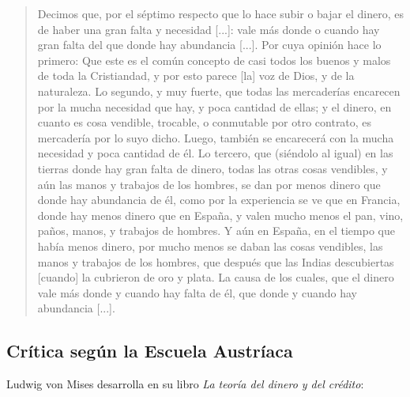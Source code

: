 \documentclass[12pt,a4paper,twoside]{book}
\begin{document}
\begin{quotation}
Decimos que, por el séptimo respecto que lo hace subir o bajar el dinero, es de haber una gran falta y necesidad [...]: vale más donde o cuando hay gran falta del que donde hay abundancia [...]. Por cuya opinión hace lo primero: Que este es el común concepto de casi todos los buenos y malos de toda la Cristiandad, y por esto parece [la] voz de Dios, y de la naturaleza. Lo segundo, y muy fuerte, que todas las mercaderías encarecen por la mucha necesidad que hay, y poca cantidad de ellas; y el dinero, en cuanto es cosa vendible, trocable, o conmutable por otro contrato, es mercadería por lo suyo dicho. Luego, también se encarecerá con la mucha necesidad y poca cantidad de él. Lo tercero, que (siéndolo al igual) en las tierras donde hay gran falta de dinero, todas las otras cosas vendibles, y aún las manos y trabajos de los hombres, se dan por menos dinero que donde hay abundancia de él, como por la experiencia se ve que en Francia, donde hay menos dinero que en España, y valen mucho menos el pan, vino, paños, manos, y trabajos de hombres. Y aún en España, en el tiempo que había menos dinero, por mucho menos se daban las cosas vendibles, las manos y trabajos de los hombres, que después que las Indias descubiertas [cuando] la cubrieron de oro y plata. La causa de los cuales, que el dinero vale más donde y cuando hay falta de él, que donde y cuando hay abundancia [...]. \cite[págs. 54-55]{azpilcueta}
\end{quotation}

\subsection{Crítica según la Escuela Austríaca}
Ludwig von Mises desarrolla en su libro \textit{La teoría del dinero y del crédito}:
\end{document}
